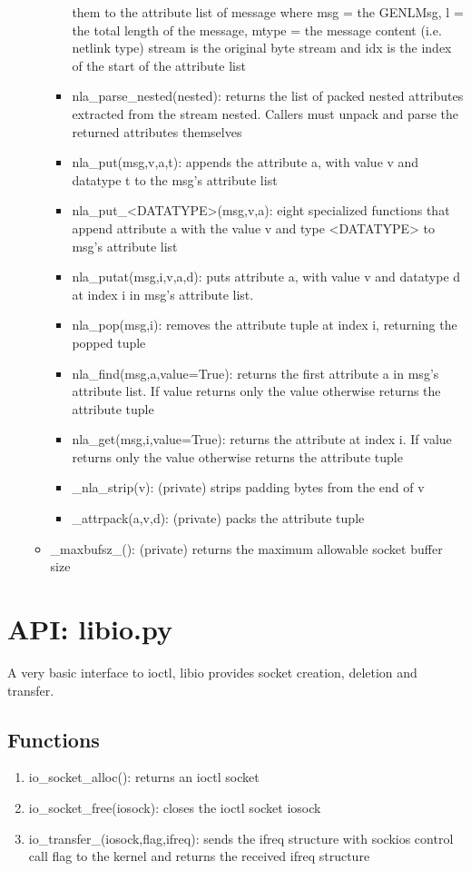 \documentclass[11pt]{article}
\begin{document}
\begin{appendices}
\begin{itemize}
\begin{itemize}
\begin{itemize}
them to the attribute list of message where msg = the GENLMsg, l = the total 
length of the message, mtype = the message content (i.e. netlink type) stream is
the original byte stream and idx is the index of the start of the attribute list
\item nla\_parse\_nested(nested): returns the list of packed nested attributes 
extracted from the stream nested. Callers must unpack and parse the returned 
attributes themselves
\item nla\_put(msg,v,a,t): appends the attribute a, with value v and datatype t 
to the msg's attribute list
\item nla\_put\_<DATATYPE>(msg,v,a): eight specialized functions that append 
attribute a with the value v and type <DATATYPE> to msg's attribute list
\item nla\_putat(msg,i,v,a,d): puts attribute a, with value v and datatype d at
index i in msg's attribute list.
\item nla\_pop(msg,i): removes the attribute tuple at index i, returning the popped
tuple
\item nla\_find(msg,a,value=True): returns the first attribute a in msg's attribute
list. If value returns only the value otherwise returns the attribute tuple
\item nla\_get(msg,i,value=True): returns the attribute at index i. If value returns 
only the value otherwise returns the attribute tuple
\item \_nla\_strip(v): (private) strips padding bytes from the end of v
\item \_attrpack(a,v,d): (private) packs the attribute tuple 
\end{itemize}
\item \_maxbufsz\_(): (private) returns the maximum allowable socket buffer size
\end{itemize}
\end{itemize}

\section{API: libio.py}\label{sec:libioapi}
A very basic interface to ioctl, libio provides socket creation, deletion and 
transfer.

\subsection{Functions}
\begin{enumerate}
\item io\_socket\_alloc(): returns an ioctl socket
\item io\_socket\_free(iosock): closes the ioctl socket iosock
\item io\_transfer\_(iosock,flag,ifreq): sends the ifreq structure with sockios 
control call flag to the kernel and returns the received ifreq structure
\end{enumerate}


\end{appendices}
\end{document}
